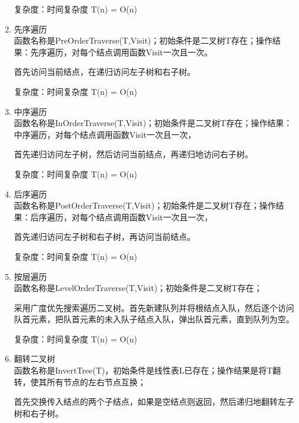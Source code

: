 \documentclass[supercite]{Experimental_Report}
\theoremstyle{definition}
\begin{document}
\begin{enumerate}
	复杂度：时间复杂度 T(n) = O(n)
	\item 先序遍历\\
	函数名称是PreOrderTraverse(T,Visit)；初始条件是二叉树T存在；操作结果：先序遍历，对每个结点调用函数Visit一次且一次。
	
	首先访问当前结点，在递归访问左子树和右子树。
	
	复杂度：时间复杂度 T(n) = O(n)
	\item 中序遍历\\
	函数名称是InOrderTraverse(T,Visit)；初始条件是二叉树T存在；操作结果：中序遍历，对每个结点调用函数Visit一次且一次，
	
	首先递归访问左子树，然后访问当前结点，再递归地访问右子树。
	
	复杂度：时间复杂度 T(n) = O(n)
	\item 后序遍历\\
	函数名称是PostOrderTraverse(T,Visit)；初始条件是二叉树T存在；操作结果：后序遍历，对每个结点调用函数Visit一次且一次，
	
	首先递归访问左子树和右子树，再访问当前结点。
	
	复杂度：时间复杂度 T(n) = O(n)
	\item 按层遍历\\
	函数名称是LevelOrderTraverse(T,Visit)；初始条件是二叉树T存在；
	
	采用广度优先搜索遍历二叉树。首先新建队列并将根结点入队，然后逐个访问队首元素，把队首元素的未入队子结点入队，弹出队首元素，直到队列为空。
	
	复杂度：时间复杂度 T(n) = O(n)
	\item 翻转二叉树\\
	函数名称是InvertTree(T)，初始条件是线性表L已存在；操作结果是将T翻转，使其所有节点的左右节点互换；
	
	首先交换传入结点的两个子结点，如果是空结点则返回，然后递归地翻转左子树和右子树。
	

\end{enumerate}
\end{document}
